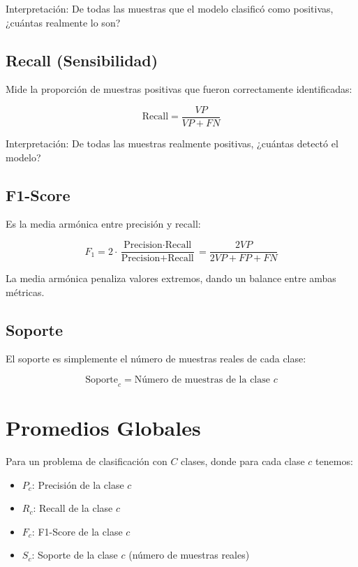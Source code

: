 \documentclass[12pt]{article}
\begin{document}
Interpretación: De todas las muestras que el modelo clasificó como positivas, ¿cuántas realmente lo son?

\subsection{Recall (Sensibilidad)}

Mide la proporción de muestras positivas que fueron correctamente identificadas:

\begin{equation}
\text{Recall} = \frac{VP}{VP + FN}
\end{equation}

Interpretación: De todas las muestras realmente positivas, ¿cuántas detectó el modelo?

\subsection{F1-Score}

Es la media armónica entre precisión y recall:

\begin{equation}
F_1 = 2 \cdot \frac{\text{Precision} \cdot \text{Recall}}{\text{Precision} + \text{Recall}} = \frac{2VP}{2VP + FP + FN}
\end{equation}

La media armónica penaliza valores extremos, dando un balance entre ambas métricas.

\subsection{Soporte}

El soporte es simplemente el número de muestras reales de cada clase:

\begin{equation}
\text{Soporte}_c = \text{Número de muestras de la clase } c
\end{equation}

\section{Promedios Globales}

Para un problema de clasificación con $C$ clases, donde para cada clase $c$ tenemos:
\begin{itemize}
\item $P_c$: Precisión de la clase $c$
\item $R_c$: Recall de la clase $c$
\item $F_c$: F1-Score de la clase $c$
\item $S_c$: Soporte de la clase $c$ (número de muestras reales)
\end{itemize}
\end{document}
